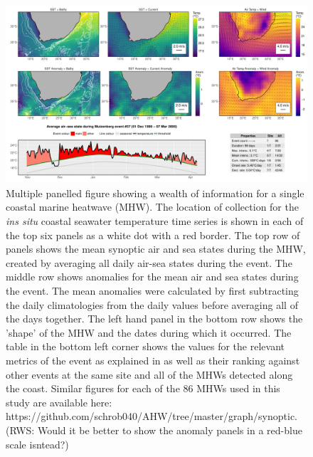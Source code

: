 \documentclass[a4paper,10pt,review]{elsarticle}
\begin{document}
\begin{figure}
\includegraphics[width=1.0\textwidth]{figure_2.pdf}
\caption{Multiple panelled figure showing a wealth of information for a single coastal marine heatwave (MHW). The location of collection for the \emph{ins situ} coastal seawater temperature time series is shown in each of the top six panels as a white dot with a red border. The top row of panels shows the mean synoptic air and sea states during the MHW, created by averaging all daily air-sea states during the event. The middle row shows anomalies for the mean air and sea states during the event. The mean anomalies were calculated by first subtracting the daily climatologies from the daily values before averaging all of the days together. The left hand panel in the bottom row shows the 'shape' of the MHW and the dates during which it occurred. The table in the bottom left corner shows the values for the relevant metrics of the event as explained in  as well as their ranking against other events at the same site and all of the MHWs detected along the coast. Similar figures for each of the 86 MHWs used in this study are available here: https://github.com/schrob040/AHW/tree/master/graph/synoptic. 
(RWS: Would it be better to show the anomaly panels in a red-blue scale isntead?)}
\label{figure2}
\end{figure}
\end{document}
